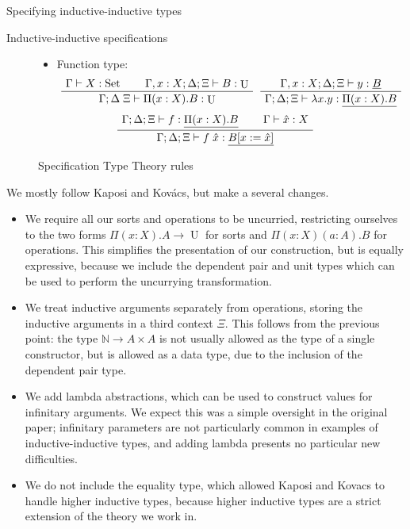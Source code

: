 \documentclass[acmsmall,review]{acmart}\settopmatter{printfolios=true,printccs=false,printacmref=false}
\newenvironment{bprooftree}
  {\leavevmode\hbox\bgroup}
  {\DisplayProof\egroup}
\DeclareMathOperator{\USet}{Set}
\DeclareMathOperator{\UU}{U}
\newcommand{\N}{\mathbb{N}}
\newcommand{\tac}{\vdash}
\begin{document}
\begin{section}{Specifying inductive-inductive types}
\begin{subsection}{Inductive-inductive specifications}
\begin{figure}[htpb]
\begin{itemize}
\begin{itemize}
            \item Function type:
            \[
                \begin{bprooftree}
                    \AxiomC{$\Gamma \tac X : \USet$}\AxiomC{$\Gamma , x : X ; \Delta ; \Xi \tac B : \UU$}\BinaryInfC{$\Gamma ; \Delta \; \Xi \tac \Pi(x : X).B : \UU$}
                \end{bprooftree}
                \begin{bprooftree}
                    \AxiomC{$\Gamma , x : X ; \Delta ; \Xi \tac y : \underline{B}$}\UnaryInfC{$\Gamma ; \Delta ; \Xi \tac \lambda x.y : \underline{\Pi(x : X).B}$}
                \end{bprooftree}
            \]
            \[
                \begin{bprooftree}
                    \AxiomC{$\Gamma ; \Delta ; \Xi \tac f : \underline{\Pi(x : X).B}$}\AxiomC{$\Gamma \tac \hat{x} : X$}\BinaryInfC{$\Gamma ; \Delta ; \Xi \tac f\; \hat{x} : \underline{B[x := \hat{x}]}$}
                \end{bprooftree}
            \]
    
        \end{itemize}
   
    \end{itemize}
    
    \caption{\label{spec-rules}Specification Type Theory rules}
\end{figure}

We mostly follow Kaposi and Kov\'acs, but make a several changes.
\begin{itemize}
    \item We require all our sorts and operations to be uncurried, restricting ourselves to the two forms $\Pi(x : X).A \to \UU$ for sorts and $\Pi(x : X)(a : A).B$ for operations. This simplifies the presentation of our construction, but is equally expressive, because we include the dependent pair and unit types which can be used to perform the uncurrying transformation.
    \item We treat inductive arguments separately from operations, storing the inductive arguments in a third context $\Xi$. This follows from the previous point: the type $\N \to A \times A$ is not usually allowed as the type of a single constructor, but is allowed as a data type, due to the inclusion of the dependent pair type.
    \item We add lambda abstractions, which can be used to construct values for infinitary arguments. We expect this was a simple oversight in the original paper; infinitary parameters are not particularly common in examples of inductive-inductive types, and adding lambda presents no particular new difficulties.
    \item We do not include the equality type, which allowed Kaposi and Kovacs to handle higher inductive types, because higher inductive types are a strict extension of the theory we work in. \citep{hit_extension_kraus_2018}
\end{itemize}


\end{subsection}
\end{section}
\end{document}
